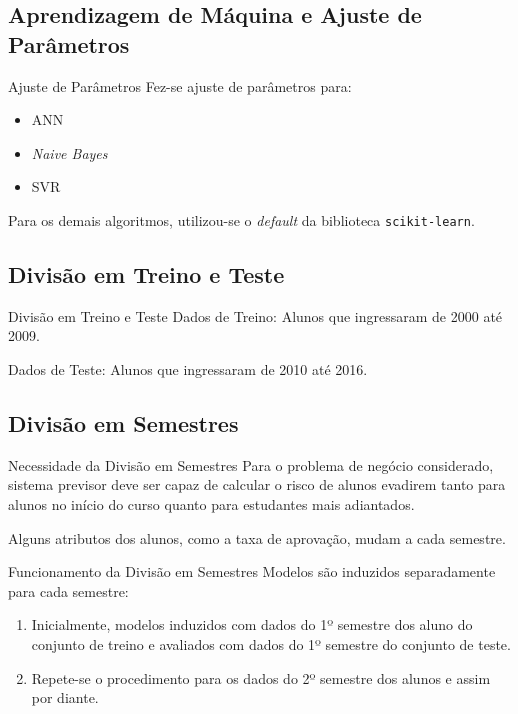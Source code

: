 \subsection{Aprendizagem de Máquina e Ajuste de Parâmetros}
\begin{frame}{Ajuste de Parâmetros}
    Fez-se ajuste de parâmetros para:
    \begin{itemize}
        \item ANN
        \item \textit{Naive Bayes}
        \item SVR
    \end{itemize}

    \vspace{0.5cm}

    Para os demais algoritmos, utilizou-se o \textit{default} da biblioteca
    \texttt{scikit-learn}.
\end{frame}

\subsection{Divisão em Treino e Teste}
\begin{frame}{Divisão em Treino e Teste}
    Dados de Treino: Alunos que ingressaram de 2000 até 2009.

    \vspace{0.5cm}

    Dados de Teste: Alunos que ingressaram de 2010 até 2016.
\end{frame}

\subsection{Divisão em Semestres}
\begin{frame}{Necessidade da Divisão em Semestres}
    Para o problema de negócio considerado, sistema previsor deve ser capaz de
    calcular o risco de alunos evadirem tanto para alunos no início do curso quanto
    para estudantes mais adiantados. 

    \vspace{0.5cm}

    Alguns atributos dos alunos, como a taxa de aprovação, mudam a cada semestre.
\end{frame}

\begin{frame}{Funcionamento da Divisão em Semestres}
    Modelos são induzidos separadamente para cada
    semestre: 
    \begin{enumerate}
        \item Inicialmente, modelos induzidos com dados do 1º semestre dos
             aluno do conjunto de treino e avaliados com dados do 1º semestre do
             conjunto de teste. 
         \item Repete-se o procedimento para os dados do 2º semestre dos alunos e
             assim por diante.
    \end{enumerate}
\end{frame}

